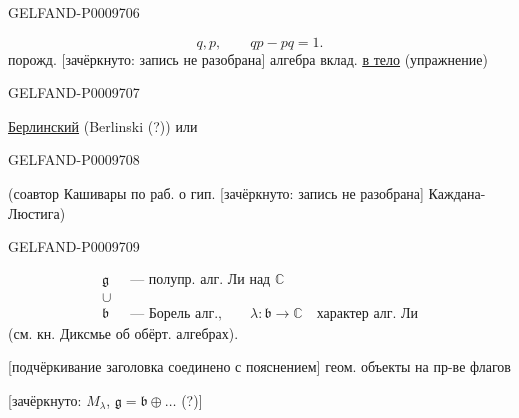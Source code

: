 \begin{GelfandAdjacentEvidence}{GELFAND-P000970}{6}

\[
 q,p,\qquad qp-pq=1.
\]
порожд. [зачёркнуто: запись не разобрана] алгебра вклад. \underline{\underline{в тело}} (упражнение)
\end{GelfandAdjacentEvidence}
\begin{GelfandAdjacentEvidence}{GELFAND-P000970}{7}


\underline{Берлинский} (Berlinski (?)) или 
\end{GelfandAdjacentEvidence}
\begin{GelfandAdjacentEvidence}{GELFAND-P000970}{8}


(соавтор Кашивары по раб. о гип. [зачёркнуто: запись не разобрана] Каждана-Люстига)
\end{GelfandAdjacentEvidence}
\begin{GelfandAdjacentEvidence}{GELFAND-P000970}{9}

\[
\begin{aligned}
 \mathfrak g&\text{ --- полупр. алг. Ли над }\mathbb C\\
 \cup\ &\\
 \mathfrak b&\text{ --- Борель алг.,}\qquad
 \lambda\colon\mathfrak b\to\mathbb C\quad\text{характер алг. Ли}
\end{aligned}
\]
\quad (см. кн. Диксмье об обёрт. алгебрах).

[подчёркивание заголовка соединено с пояснением] геом. объекты на пр-ве флагов

[зачёркнуто: \(M_\lambda\), \(\mathfrak g=\mathfrak b\oplus\ldots\) (?)]
\end{GelfandAdjacentEvidence}

